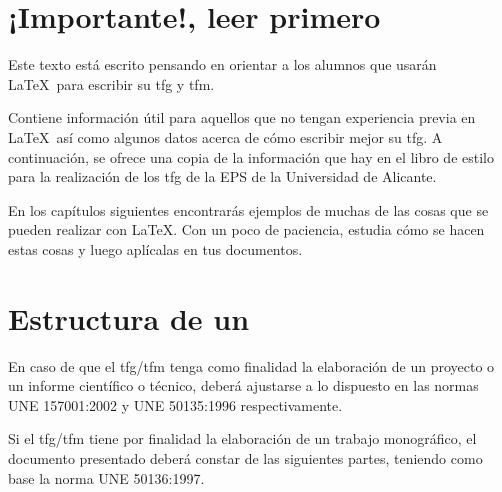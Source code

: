 \section{¡Importante!, leer primero}

Este texto está escrito pensando en orientar a los alumnos que usarán \LaTeX~para escribir su \gls{tfg} y \gls{tfm}. 
\\
\par Contiene información útil para aquellos que no tengan experiencia previa en \LaTeX~así como algunos datos acerca de cómo escribir mejor su \gls{tfg}.
A continuación, se ofrece una copia de la información que hay en el libro de estilo para la realización de los \gls{tfg} de la EPS de la Universidad de Alicante.

En los capítulos siguientes encontrarás ejemplos de muchas de las cosas que se pueden realizar con \LaTeX. Con un poco de paciencia, estudia cómo se hacen estas cosas y luego aplícalas en tus documentos.


\section{Estructura de un }

En caso de que el \gls{tfg}/\gls{tfm} tenga como finalidad la elaboración de un proyecto o un 
informe científico o técnico, deberá ajustarse a lo dispuesto en las normas UNE 
157001:2002 y UNE 50135:1996 respectivamente.

Si el \gls{tfg}/\gls{tfm} tiene por finalidad la elaboración de un trabajo monográfico, el 
documento presentado deberá constar de las siguientes partes, teniendo como base la 
norma UNE 50136:1997.

